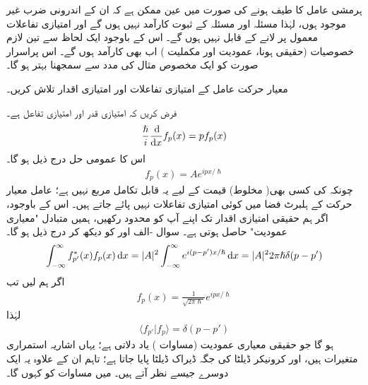 ہرمشی عامل کا طیف  ہونے کی صورت میں عین ممکن ہے کہ ان کے اندرونی ضرب غیر موجود ہوں، لہٰذا مسئلہ  اور مسئلہ  کے ثبوت کارآمد نہیں ہوں گے اور امتیازی تفاعلات معمول پر لانے کے قابل نہیں ہوں گے۔ اس کے باوجود ایک لحاظ سے تین لازم خصوصیات (حقیقی ہونا، عمودیت اور مکملیت ) اب بھی کارآمد ہوں گے۔ اس پراسرار صورت کو ایک مخصوص مثال کی مدد سے سمجھنا بہتر ہو گا۔



معیار حرکت عامل کے امتیازی تفاعلات اور امتیازی اقدار تلاش کریں۔

\quad
فرض کریں کہ  امتیازی قدر اور  امتیازی تفاعل ہے۔
\begin{align}
\frac{\hslash}{i} \frac{\dif}{\dif x} f_{p}(x) = pf_{p}(x)
\end{align}
اس کا عمومی حل درج ذیل ہو گا۔
\begin{align*}
f_{p}(x) = Ae^{ipx/\hslash}
\end{align*}
چونکہ  کی کسی بھی( مخلوط) قیمت کے لیے یہ قابل تکامل مربع نہیں ہے؛ عامل معیار حرکت کے ہلبرٹ فضا میں کوئی امتیازی تفاعلات نہیں پائے جاتے ہیں۔ اس کے باوجود، اگر ہم حقیقی امتیازی اقدار تک اپنے آپ کو محدود رکھیں، ہمیں متبادل "معیاری عمودیت" حاصل ہوتی ہے۔ سوال -الف اور  کو دیکھ کر درج ذیل ہو گا۔
\begin{align}
\int_{-\infty}^{\infty} f_{p'}^{*}(x)f_{p}(x) \dif x = |A|^{2}\int_{-\infty}^{\infty}e^{i(p-p')x/\hslash} \dif x = |A|^{2}2\pi\hslash\delta(p-p')
\end{align}
اگر ہم  لیں تب 
\begin{align}\label{مساوات_قواعد_امتیازی_تفاعل_معیار_حرکت}
f_{p}(x) = \frac{1}{\sqrt{2\pi\hslash}}e^{ipx/\hslash}
\end{align}
 لہٰذا 
\begin{align}\label{مساوات_قواعد_ڈیراک_معیاری_عمودیت}
\langle f_{p'} | f_{p} \rangle = \delta(p-p')
\end{align}
ہو گا جو حقیقی معیاری عمودیت (مساوات  ) یاد دلاتی ہے؛ یہاں اشاریہ استمراری متغیرات ہیں، اور کرونیکر ڈیلٹا کی جگہ ڈیراک ڈیلٹا پایا جاتا ہے؛ تاہم ان کے علاوہ یہ ایک دوسرے جیسے نظر آتے ہیں۔ میں مساوات  کو  کہوں گا۔ 

